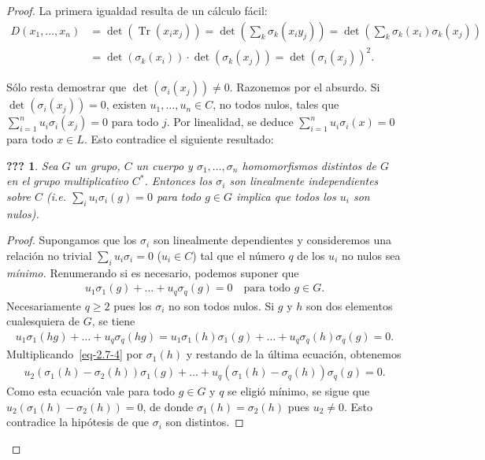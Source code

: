 \documentclass[10pt,oneside,bibtotoc,smallheadings,leqno,a5paper,DIV=12]{scrbook}
\newcommand{\QED}{}%
\DeclareMathOperator{\Tr}{Tr}
\numberwithin{equation}{section}
\theoremstyle{defi}
\theoremstyle{enonce}
\newcommand{\namedname}{???}
\newtheorem*{namedthm}{\namedname}
\newenvironment{named}[1]%
	{\renewcommand{\namedname}{#1}%
	\begin{namedthm}}%
	{\end{namedthm}}
\theoremstyle{rem}
\numberwithin{theorem}{section}
\numberwithin{proposition}{section}
\numberwithin{definition}{section}
\numberwithin{lemma}{section}
\numberwithin{corollary}{section}
\numberwithin{example}{section}
\numberwithin{footnote}{section}%
\begin{document}
\begin{proof}
La primera igualdad resulta de un c\'alculo f\'acil:
\begin{align*}
D(x_{1},\dots,x_{n}) &= \det(\Tr(x_{i}x_{j})) = \det\left(\sum_{k}\sigma_{k}(x_{i}y_{j})\right)
= \det\left(\sum_{k}\sigma_{k}(x_{i})\sigma_{k}(x_{j})\right)\\
&= \det(\sigma_{k}(x_{i}))\cdot\det(\sigma_{k}(x_{j})) = \det(\sigma_{i}(x_{j}))^{2}.
\end{align*}

S\'olo resta demostrar que $\det(\sigma_{i}(x_{j}))\neq 0$. Razonemos por el absurdo. Si $\det(\sigma_{i}(x_{j})) = 0$,
existen $u_{1},\dots,u_{n}\in C$, no todos nulos, tales que $\sum_{i=1}^{n}u_{i}\sigma_{i}(x_{j}) = 0$ para todo $j$.
Por linealidad, se deduce $\sum_{i=1}^{n}u_{i}\sigma_{i}(x) = 0$ para todo $x\in L$. Esto contradice el siguiente
resultado:

\begin{named}{Lema de Dedekind}
Sea $G$ un grupo, $C$ un cuerpo y $\sigma_{1},\dots,\sigma_{n}$ homomorfismos distintos de $G$ en el grupo
multiplicativo $C^{*}$. Entonces los $\sigma_{i}$ son linealmente independientes sobre $C$ (i.e.
$\sum_{i}u_{i}\sigma_{i}(g) = 0$ para todo $g\in G$ implica que todos los $u_{i}$ son nulos{\upshape).}
\end{named}

\begin{proof}
Supongamos que los $\sigma_{i}$ son linealmente dependientes y consideremos una relaci\'on no trivial
$\sum_{i}u_{i}\sigma_{i} = 0$ ($u_{i}\in C$) tal que el n\'umero $q$ de los $u_{i}$ no nulos sea {\em
m\'inimo.} Renumerando si es necesario, podemos suponer que
\begin{gather}\label{eq-2.7-4}
u_{1}\sigma_{1}(g) +\dots+u_{q}\sigma_{q}(g) = 0\quad\text{para todo $g\in G$}.
\end{gather}
Necesariamente $q\geq 2$ pues los $\sigma_{i}$ no son todos nulos. Si $g$ y $h$ son dos elementos
cualesquiera de $G$, se tiene
\begin{gather*}
u_{1}\sigma_{1}(hg) + \dots + u_{q}\sigma_{q}(hg) = u_{1}\sigma_{1}(h)\sigma_{1}(g)+\dots+u_{q}\sigma_{q}(h)\sigma_{q}(g) = 0.
\end{gather*}
Multiplicando~\eqref{eq-2.7-4} por $\sigma_{1}(h)$ y restando de la \'ultima ecuaci\'on, obtenemos
\begin{gather*}
u_{2}(\sigma_{1}(h)-\sigma_{2}(h))\sigma_{1}(g)+\dots+u_{q}(\sigma_{1}(h)-\sigma_{q}(h))\sigma_{q}(g) = 0.
\end{gather*}
Como esta ecuaci\'on vale para todo $g\in G$ y $q$ se eligi\'o m\'inimo, se sigue que
$u_{2}(\sigma_{1}(h)-\sigma_{2}(h)) = 0$, de donde $\sigma_{1}(h) = \sigma_{2}(h)$ pues $u_{2}\neq 0$.
Esto contradice la hip\'otesis de que $\sigma_{i}$ son distintos. \QED
\end{proof}
\end{proof}
\end{document}
